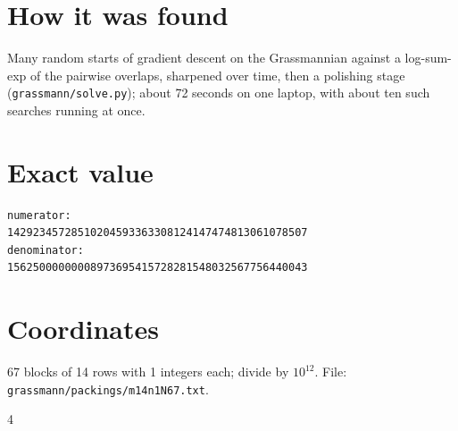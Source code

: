\documentclass[11pt,a4paper]{article}
\begin{document}
\section{How it was found}
Many random starts of gradient descent on the Grassmannian against a log-sum-exp of the pairwise overlaps, sharpened over time, then a polishing stage (\texttt{grassmann/solve.py}); about 72 seconds on one laptop, with about ten such searches running at once.


\appendix
\section{Exact value}
{\small
\begin{verbatim}
numerator:
14292345728510204593363308124147474813061078507
denominator:
15625000000008973695415728281548032567756440043
\end{verbatim}}

\section{Coordinates}
67 blocks of 14 rows with 1 integers each; divide by $10^{12}$. File: \texttt{grassmann/packings/m14n1N67.txt}.
{\tiny
\begin{multicols}{4}
\end{multicols}}
\end{document}
